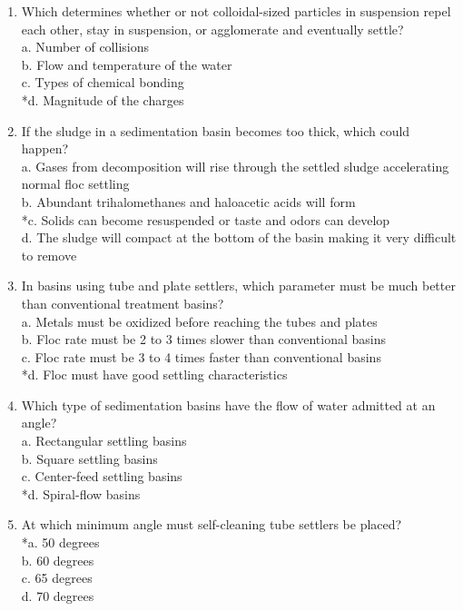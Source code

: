 \begin{enumerate}
  \item Which determines whether or not colloidal-sized particles in suspension repel each other, stay in suspension, or agglomerate and eventually settle?\\
a. Number of collisions\\
b. Flow and temperature of the water\\
c. Types of chemical bonding\\
*d. Magnitude of the charges\\
  \item If the sludge in a sedimentation basin becomes too thick, which could happen?\\
a. Gases from decomposition will rise through the settled sludge accelerating normal floc settling\\
b. Abundant trihalomethanes and haloacetic acids will form\\
*c. Solids can become resuspended or taste and odors can develop\\
d. The sludge will compact at the bottom of the basin making it very difficult to remove\\
  \item In basins using tube and plate settlers, which parameter must be much better than conventional treatment basins?\\
a. Metals must be oxidized before reaching the tubes and plates\\
b. Floc rate must be 2 to 3 times slower than conventional basins\\
c. Floc rate must be 3 to 4 times faster than conventional basins\\
*d. Floc must have good settling characteristics \\
\item Which type of sedimentation basins have the flow of water admitted at an angle?\\
a. Rectangular settling basins\\
b. Square settling basins\\
c. Center-feed settling basins\\
*d. Spiral-flow basins\\
  \item At which minimum angle must self-cleaning tube settlers be placed?\\
*a. 50 degrees\\
b. 60 degrees\\
c. 65 degrees\\
d. 70 degrees\\


\end{enumerate}
